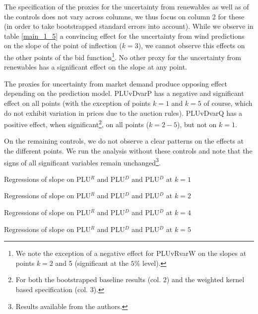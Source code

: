 The specification of the proxies for the uncertainty from renewables as well as of the controls does not vary across columns, we thus focus on column 2 for these (in order to take bootstrapped standard errors into account). 
While we observe in table \ref{main_1_5} a convincing effect for the uncertainty from wind predictions on the slope of the point of inflection ($k=3$), we cannot observe this effects on the other points of the bid function\footnote{We note the exception of a negative effect for PLUvRvarW on the slopes at points $k=2$ and 5 (significant at the $5\%$ level).}. No other proxy for the uncertainty from renewables has a significant effect on the slope at any point. 

The proxies for uncertainty from market demand produce opposing effect depending on the prediction model. PLUvDvarP has a negative and significant effect on all points (with the exception of points $k=1$ and $k=5$ of course, which do not exhibit variation in prices due to the auction rules). PLUvDvarQ has a positive effect, when significant\footnote{For both the bootstrapped baseline results (col. 2) and the weighted kernel based specification (col. 3). }, on all points ($k=2-5$), but not on $k=1$. 

On the remaining controls, we do not observe a clear patterns on the effects at the different points. We run the analysis without these controls and note that the signs of all significant variables remain unchanged\footnote{Results available from the authors.}.


\begin{table}[!ht]
\vspace{-2.5cm}

\vspace{-0.2cm}
\caption{\label{mainNS1_1} Regressions of slope on PLU$^R$ and PLU$^{D}$ and PLU$^{D}$ at $k=1$}
\vspace{0.9cm}

\vspace{-0.2cm}
\caption{\label{mainNS1_3} Regressions of slope on PLU$^R$ and PLU$^{D}$ and PLU$^{D}$ at $k=2$}
\end{table}
\pagestyle{empty}

\begin{table}[!ht]
\vspace{-2.5cm}

\vspace{-0.2cm}
\caption{\label{mainNS1_7} Regressions of slope on PLU$^R$ and PLU$^{D}$ and PLU$^{D}$ at $k=4$}
\vspace{0.9cm}

\vspace{-0.2cm}
\caption{\label{mainNS1_9} Regressions of slope on PLU$^R$ and PLU$^{D}$ and PLU$^{D}$ at $k=5$}
\end{table}


